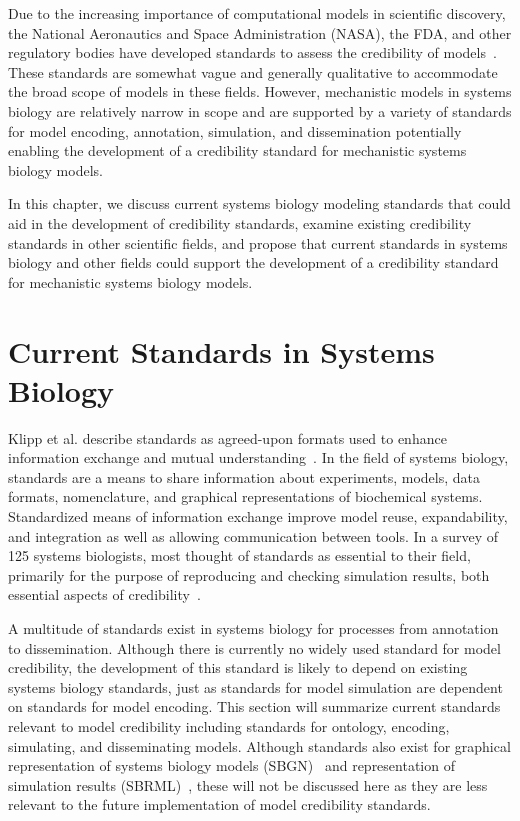 \documentclass[12pt]{report}
\begin{document}
Due to the increasing importance of computational models in scientific discovery, the National Aeronautics and Space Administration (NASA), the FDA, and other regulatory bodies have developed standards to assess the credibility of models~\cite{babula_nasa_2009,FDAguidelines,Shepard2015}. These standards are somewhat vague and generally qualitative to accommodate the broad scope of models in these fields. However, mechanistic models in systems biology are relatively narrow in scope and are supported by a variety of standards for model encoding, annotation, simulation, and dissemination potentially enabling the development of a credibility standard for mechanistic systems biology models.

In this chapter, we discuss current systems biology modeling standards that could aid in the development of credibility standards, examine existing credibility standards in other scientific fields, and propose that current standards in systems biology and other fields could support the development of a credibility standard for mechanistic systems biology models.

\section{Current Standards in Systems Biology}

Klipp et al. describe standards as agreed-upon formats used to enhance information exchange and mutual understanding~\cite{Klipp2007StandardsIC}. In the field of systems biology, standards are a means to share information about experiments, models, data formats, nomenclature, and graphical representations of biochemical systems. Standardized means of information exchange improve model reuse, expandability, and integration as well as allowing communication between tools. In a survey of 125 systems biologists, most thought of standards as essential to their field, primarily for the purpose of reproducing and checking simulation results, both essential aspects of credibility~\cite{Klipp2007StandardsIC}.

A multitude of standards exist in systems biology for processes from annotation to dissemination. Although there is currently no widely used standard for model credibility, the development of this standard is likely to depend on existing systems biology standards, just as standards for model simulation are dependent on standards for model encoding. This section will summarize current standards relevant to model credibility including standards for ontology, encoding, simulating, and disseminating models.  Although standards also exist for graphical representation of systems biology models (SBGN)~\cite{SBGN} and representation of simulation results (SBRML)~\cite{SBRML}, these will not be discussed here as they are less relevant to the future implementation of model credibility standards. 
\end{document}
